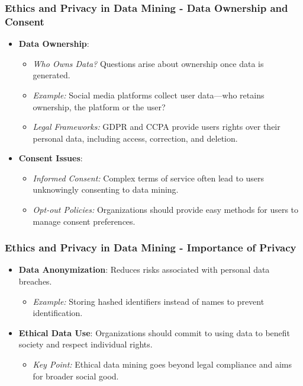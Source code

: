 \documentclass{beamer}
\begin{document}
\begin{frame}[fragile]
    \frametitle{Ethics and Privacy in Data Mining - Data Ownership and Consent}
    \begin{itemize}
        \item \textbf{Data Ownership}:
        \begin{itemize}
            \item \textit{Who Owns Data?} Questions arise about ownership once data is generated.
            \item \textit{Example:} Social media platforms collect user data—who retains ownership, the platform or the user?
            \item \textit{Legal Frameworks:} GDPR and CCPA provide users rights over their personal data, including access, correction, and deletion.
        \end{itemize}

        \item \textbf{Consent Issues}:
        \begin{itemize}
            \item \textit{Informed Consent:} Complex terms of service often lead to users unknowingly consenting to data mining.
            \item \textit{Opt-out Policies:} Organizations should provide easy methods for users to manage consent preferences.
        \end{itemize}
    \end{itemize}
\end{frame}

\begin{frame}[fragile]
    \frametitle{Ethics and Privacy in Data Mining - Importance of Privacy}
    \begin{itemize}
        \item \textbf{Data Anonymization}: Reduces risks associated with personal data breaches.
        \begin{itemize}
            \item \textit{Example:} Storing hashed identifiers instead of names to prevent identification.
        \end{itemize}
        
        \item \textbf{Ethical Data Use}: Organizations should commit to using data to benefit society and respect individual rights.
        \begin{itemize}
            \item \textit{Key Point:} Ethical data mining goes beyond legal compliance and aims for broader social good.
        \end{itemize}
    \end{itemize}
\end{frame}
\end{document}
